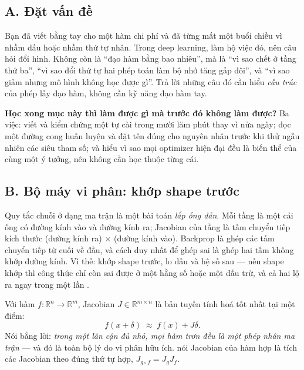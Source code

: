 \documentclass[../../../deep_learning.tex]{subfiles}
\begin{document}
\subsection{A. Đặt vấn đề}
Bạn đã viết  bằng tay cho một hàm chi phí  và đã từng mất một buổi chiều vì nhầm dấu hoặc nhầm thứ tự nhân. Trong deep learning,  làm hộ việc đó, nên câu hỏi đổi hình. Không còn là ``đạo hàm bằng bao nhiêu'', mà là ``vì sao  chết ở tầng thứ ba'', ``vì sao đổi thứ tự hai phép toán làm bộ nhớ tăng gấp đôi'', và ``vì sao  giảm nhưng mô hình không học được gì''. Trả lời những câu đó cần hiểu \emph{cấu trúc} của phép lấy đạo hàm, không cần kỹ năng đạo hàm tay.

\textbf{Học xong mục này thì làm được gì mà trước đó không làm được?} Ba việc: viết và kiểm chứng một  tự cài trong mười lăm phút thay vì nửa ngày; đọc một đường cong huấn luyện và đặt tên đúng cho nguyên nhân trước khi thử ngẫu nhiên các siêu tham số; và hiểu vì sao mọi optimizer hiện đại đều là biến thể của cùng một ý tưởng, nên không cần học thuộc từng cái.

\subsection{B. Bộ máy vi phân: khớp shape trước}
\begin{trucgiac}
Quy tắc chuỗi ở dạng ma trận là một bài toán \emph{lắp ống dẫn}. Mỗi tầng là một cái ống có đường kính vào và đường kính ra; Jacobian của tầng là tấm chuyển tiếp kích thước (đường kính ra) \(\times\) (đường kính vào). Backprop là ghép các tấm chuyển tiếp từ cuối về đầu, và cách duy nhất để ghép sai là ghép hai tấm không khớp đường kính. Vì thế: khớp shape trước, lo dấu và hệ số sau --- nếu shape khớp thì công thức chỉ còn sai được ở một hằng số hoặc một dấu trừ, và cả hai lộ ra ngay trong một lần .
\end{trucgiac}

Với hàm \(f:\mathbb{R}^n\to\mathbb{R}^m\), Jacobian \(J\in\mathbb{R}^{m\times n}\) là bản tuyến tính hoá tốt nhất tại một điểm:
\[
f(x+\delta)\;\approx\; f(x)+J\delta .
\]
Nói bằng lời: \emph{trong một lân cận đủ nhỏ, mọi hàm trơn đều là một phép nhân ma trận} --- và đó là toàn bộ lý do vi phân hữu ích.  nói Jacobian của hàm hợp là tích các Jacobian theo đúng thứ tự hợp, \(J_{g\circ f} = J_g J_f\).
\end{document}
